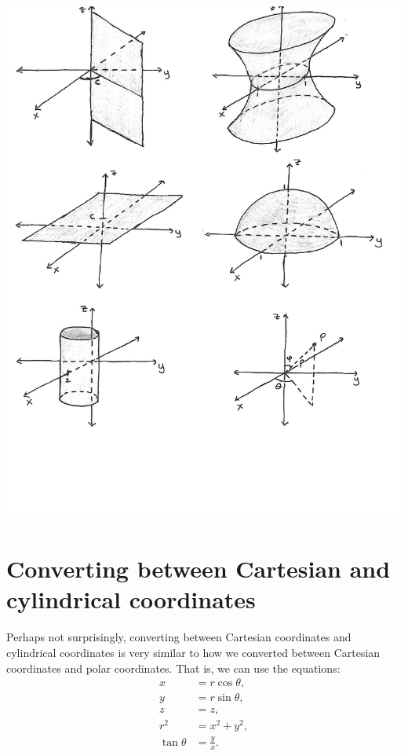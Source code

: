 \documentclass{ximera}
\begin{document}
\begin{image}
\includegraphics{z_constant}
\end{image}

\section{Converting between Cartesian and cylindrical coordinates}

Perhaps not surprisingly, converting between Cartesian coordinates and cylindrical coordinates is very similar to how we converted between Cartesian coordinates and polar coordinates. That is, we can use the equations:
\begin{align*}
x &= r\cos\theta, \\
y &= r\sin\theta, \\
z &= z,\\
r^2 &= x^2 + y^2, \\
\tan\theta &= \frac{y}{x}.
\end{align*}
\end{document}
